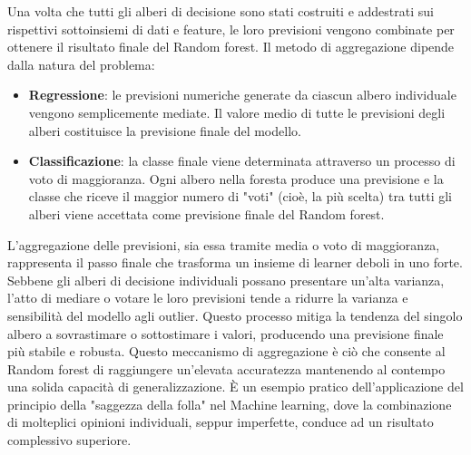\documentclass[a4paper,12pt]{report}
\begin{document}
	Una volta che tutti gli alberi di decisione sono stati costruiti e addestrati sui rispettivi sottoinsiemi di dati e feature, le loro previsioni vengono combinate per ottenere il risultato finale del Random forest. Il metodo di aggregazione dipende dalla natura del problema:
	\begin{itemize}
		\item \textbf{Regressione}: le previsioni numeriche generate da ciascun albero individuale vengono semplicemente mediate. Il valore medio di tutte le previsioni degli alberi costituisce la previsione finale del modello.
		\item \textbf{Classificazione}: la classe finale viene determinata attraverso un processo di voto di maggioranza. Ogni albero nella foresta produce una previsione e la classe che riceve il maggior numero di "voti" (cioè, la più scelta) tra tutti gli alberi viene accettata come previsione finale del Random forest.
	\end{itemize}
	
	L'aggregazione delle previsioni, sia essa tramite media o voto di maggioranza, rappresenta il passo finale che trasforma un insieme di learner deboli in uno forte. Sebbene gli alberi di decisione individuali possano presentare un'alta varianza, l'atto di mediare o votare le loro previsioni tende a ridurre la varianza e sensibilità del modello agli outlier. Questo processo mitiga la tendenza del singolo albero a sovrastimare o sottostimare i valori, producendo una previsione finale più stabile e robusta. Questo meccanismo di aggregazione è ciò che consente al Random forest di raggiungere un'elevata accuratezza mantenendo al contempo una solida capacità di generalizzazione. È un esempio pratico dell'applicazione del principio della "saggezza della folla" nel Machine learning, dove la combinazione di molteplici opinioni individuali, seppur imperfette, conduce ad un risultato complessivo superiore.
	
\end{document}
